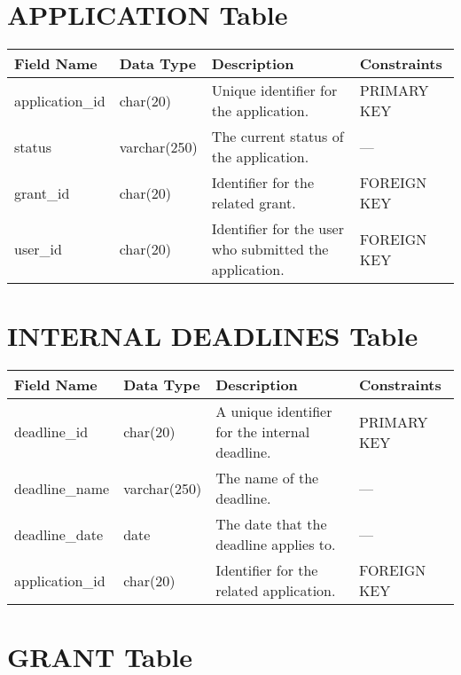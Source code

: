 \documentclass[12pt]{article}
\begin{document}
\section{APPLICATION Table}

\begin{longtable}{@{}p{4cm}p{3cm}p{6cm}p{3cm}@{}}
\toprule
\textbf{Field Name} & \textbf{Data Type} & \textbf{Description} & \textbf{Constraints} \\ \midrule
\endhead
application\_id & char(20) & Unique identifier for the application. & PRIMARY KEY \\
status & varchar(250) & The current status of the application. & --- \\
grant\_id & char(20) & Identifier for the related grant. & FOREIGN KEY \\
user\_id & char(20) & Identifier for the user who submitted the application. & FOREIGN KEY \\
\bottomrule
\end{longtable}

\section{INTERNAL DEADLINES Table}

\begin{longtable}{@{}p{4cm}p{3cm}p{6cm}p{3cm}@{}}
\toprule
\textbf{Field Name} & \textbf{Data Type} & \textbf{Description} & \textbf{Constraints} \\ \midrule
\endhead
deadline\_id & char(20) & A unique identifier for the internal deadline. & PRIMARY KEY \\
deadline\_name & varchar(250) & The name of the deadline. & --- \\
deadline\_date & date & The date that the deadline applies to. & --- \\
application\_id & char(20) & Identifier for the related application. & FOREIGN KEY \\
\bottomrule
\end{longtable}

\section{GRANT Table}
\end{document}
